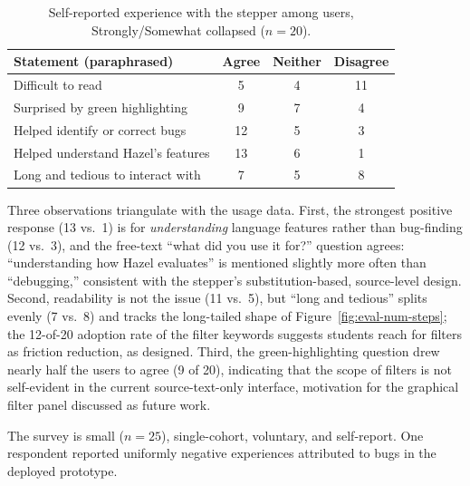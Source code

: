 \begin{table}[ht]
  \centering
  \caption{Self-reported experience with the stepper among users, Strongly/Somewhat collapsed ($n=20$).}
  \label{tab:eval-survey-likert}
  \begin{tabular}{lccc}
    \toprule
    Statement (paraphrased) & Agree & Neither & Disagree \\
    \midrule
    Difficult to read                       & 5  & 4 & 11 \\
    Surprised by green highlighting         & 9  & 7 & 4  \\
    Helped identify or correct bugs         & 12 & 5 & 3  \\
    Helped understand Hazel's features      & 13 & 6 & 1  \\
    Long and tedious to interact with       & 7  & 5 & 8  \\
    \bottomrule
  \end{tabular}
\end{table}

Three observations triangulate with the usage data. First, the
strongest positive response (13 vs.\ 1) is for \emph{understanding}
language features rather than bug-finding (12 vs.\ 3), and the
free-text ``what did you use it for?'' question agrees: ``understanding
how Hazel evaluates'' is mentioned slightly more often than
``debugging,'' consistent with the stepper's substitution-based,
source-level design. Second, readability is not the issue (11 vs.\ 5),
but ``long and tedious'' splits evenly (7 vs.\ 8) and tracks the
long-tailed shape of Figure~\ref{fig:eval-num-steps}; the
12-of-20 adoption rate of the filter keywords suggests students
reach for filters as friction reduction, as designed. Third, the
green-highlighting question drew nearly half the users to agree
(9 of 20), indicating that the scope of filters is not
self-evident in the current source-text-only interface, motivation
for the graphical filter panel discussed as future work.

The survey is small ($n=25$), single-cohort, voluntary, and
self-report. One respondent reported uniformly negative experiences
attributed to bugs in the deployed prototype.

